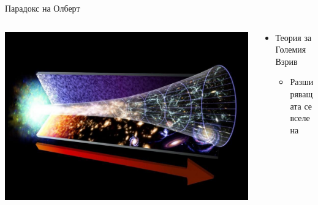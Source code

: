 \documentclass[10pt,a4paper]{beamer}
\begin{document}
        \begin{frame}{ Парадокс на Олберт }
            \begin{columns}
                \begin{column}{0.5\textwidth}
                    \includegraphics[width=\textwidth]{images/big_bang_theory.jpeg}
                \end{column}
                \begin{column}{0.5\textwidth}
                    \begin{itemize}
                        \item Теория за Големия Взрив \begin{itemize}
                            \item Разширяващата се вселена
                        \end{itemize}
                    \end{itemize}
                \end{column}
            \end{columns}
        \end{frame}
    
\end{document}
